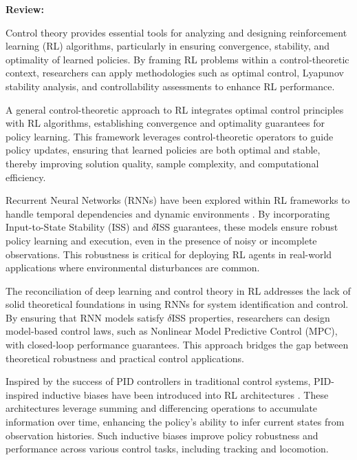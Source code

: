\documentclass{article}
\theoremstyle{plain}
\theoremstyle{definition}
\theoremstyle{remark}
\begin{document}
\textbf{Review:}

Control theory provides essential tools for analyzing and designing reinforcement learning (RL) algorithms, particularly in ensuring convergence, stability, and optimality of learned policies. By framing RL problems within a control-theoretic context, researchers can apply methodologies such as optimal control, Lyapunov stability analysis, and controllability assessments to enhance RL performance.

A general control-theoretic approach to RL \cite{chenGeneralControltheoreticApproach2024} integrates optimal control principles with RL algorithms, establishing convergence and optimality guarantees for policy learning. This framework leverages control-theoretic operators to guide policy updates, ensuring that learned policies are both optimal and stable, thereby improving solution quality, sample complexity, and computational efficiency.

Recurrent Neural Networks (RNNs) have been explored within RL frameworks to handle temporal dependencies and dynamic environments \cite{bonassiRecurrentNeuralNetworks2022}. By incorporating Input-to-State Stability (ISS) and $\delta$ISS guarantees, these models ensure robust policy learning and execution, even in the presence of noisy or incomplete observations. This robustness is critical for deploying RL agents in real-world applications where environmental disturbances are common.

The reconciliation of deep learning and control theory in RL \cite{bonassiReconcilingDeepLearning2024} addresses the lack of solid theoretical foundations in using RNNs for system identification and control. By ensuring that RNN models satisfy $\delta$ISS properties, researchers can design model-based control laws, such as Nonlinear Model Predictive Control (MPC), with closed-loop performance guarantees. This approach bridges the gap between theoretical robustness and practical control applications.

Inspired by the success of PID controllers in traditional control systems, PID-inspired inductive biases have been introduced into RL architectures \cite{charPIDinspiredInductiveBiases}. These architectures leverage summing and differencing operations to accumulate information over time, enhancing the policy's ability to infer current states from observation histories. Such inductive biases improve policy robustness and performance across various control tasks, including tracking and locomotion.
\end{document}
